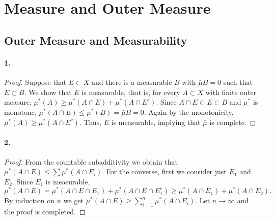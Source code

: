 \section{Measure and Outer Measure}
\subsection{Outer Measure and Measurability}
  \paragraph{1.}
  \begin{proof}
    Suppose that $E\subset X$ and there is a measurable $B$ with $\bar{\mu}B=0$
    such that $E\subset B$. We show that $E$ is measurable, that is, for every
    $A\subset X$ with finite outer measure, $\mu^*(A)\ge\mu^*(A\cap E)+\mu^*(
    A\cap E^c)$. Since $A\cap E\subset E\subset B$ and $\mu^*$ is monotone,
    $\mu^*(A\cap E)\le\mu^*(B)=\bar{\mu}B=0$. Again by the monotonicity, $\mu^*(
    A)\ge\mu^*(A\cap E^c)$. Thus, $E$ is measurable, implying that $\bar{\mu}$
    is complete.
  \end{proof}

  \paragraph{2.}
  \begin{proof}
    From the countable subadditivity we obtain that $\mu^*(A\cap E)\le\sum\mu^*
    (A\cap E_i)$. For the converse, first we consider just $E_1$ and $E_2$. 
    Since $E_1$ is measurable,
    \[
      \mu^*(A\cap E)=\mu^*(A\cap E\cap E_1)+\mu^*(A\cap E\cap E_1^c)
      \ge\mu^*(A\cap E_1)+\mu^*(A\cap E_2).
    \]
    By induction on $n$ we get $\mu^*(A\cap E)\ge\sum_{i=1}^n\mu^*(A\cap E_i)$.
    Let $n\to\infty$ and the proof is completed.
  \end{proof}


